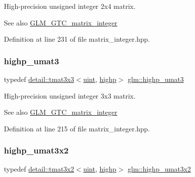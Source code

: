 High-\/precision unsigned integer 2x4 matrix. \begin{DoxySeeAlso}{See also}
\hyperlink{group__gtc__matrix__integer}{G\+L\+M\+\_\+\+G\+T\+C\+\_\+matrix\+\_\+integer} 
\end{DoxySeeAlso}


Definition at line 231 of file matrix\+\_\+integer.\+hpp.

\mbox{\label{group__gtc__matrix__integer_ga2a271939d0123103f088e325e5123385}} 
\subsubsection{\texorpdfstring{highp\+\_\+umat3}{highp\_umat3}}
{\footnotesize\ttfamily typedef \hyperlink{structglm_1_1detail_1_1tmat3x3}{detail\+::tmat3x3}$<$\hyperlink{group__core__precision_ga4fd29415871152bfb5abd588334147c8}{uint}, \hyperlink{namespaceglm_a0f04f086094c747d227af4425893f545ac6f7eab42eacbb10d59a58e95e362074}{highp}$>$ \hyperlink{group__gtc__matrix__integer_ga2a271939d0123103f088e325e5123385}{glm\+::highp\+\_\+umat3}}

High-\/precision unsigned integer 3x3 matrix. \begin{DoxySeeAlso}{See also}
\hyperlink{group__gtc__matrix__integer}{G\+L\+M\+\_\+\+G\+T\+C\+\_\+matrix\+\_\+integer} 
\end{DoxySeeAlso}


Definition at line 215 of file matrix\+\_\+integer.\+hpp.

\mbox{\label{group__gtc__matrix__integer_ga6f6a73ec605a515fb21d779663082ef9}} 
\subsubsection{\texorpdfstring{highp\+\_\+umat3x2}{highp\_umat3x2}}
{\footnotesize\ttfamily typedef \hyperlink{structglm_1_1detail_1_1tmat3x2}{detail\+::tmat3x2}$<$\hyperlink{group__core__precision_ga4fd29415871152bfb5abd588334147c8}{uint}, \hyperlink{namespaceglm_a0f04f086094c747d227af4425893f545ac6f7eab42eacbb10d59a58e95e362074}{highp}$>$ \hyperlink{group__gtc__matrix__integer_ga6f6a73ec605a515fb21d779663082ef9}{glm\+::highp\+\_\+umat3x2}}

